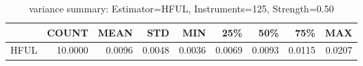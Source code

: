 \begin{table}[ht]
\centering
\caption{variance summary: Estimator=HFUL, Instruments=125, Strength=0.50}
\begin{tabular}{lrrrrrrrr}
\toprule
 & COUNT & MEAN & STD & MIN & 25\% & 50\% & 75\% & MAX \\
\midrule
HFUL & 10.0000 & 0.0096 & 0.0048 & 0.0036 & 0.0069 & 0.0093 & 0.0115 & 0.0207 \\
\bottomrule
\end{tabular}
\end{table}
